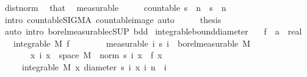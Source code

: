 \begin{isabellebody}
\ dist{\isacharunderscore}{\kern0pt}norm\ \isamarkupfalse%
\ that\ \isamarkupfalse%
\ measurable\isanewline
\ \ \isamarkupfalse%
\ \isamarkupfalse%
\ {\isachardoublequoteopen}countable\ {\isacharparenleft}{\kern0pt}s\ {\isacharbackquote}{\kern0pt}\ {\isacharbraceleft}{\kern0pt}n{\isachardot}{\kern0pt}{\isachardot}{\kern0pt}{\isacharbraceright}{\kern0pt}\ {\isasymtimes}\ s\ {\isacharbackquote}{\kern0pt}\ {\isacharbraceleft}{\kern0pt}n{\isachardot}{\kern0pt}{\isachardot}{\kern0pt}{\isacharbraceright}{\kern0pt}{\isacharparenright}{\kern0pt}{\isachardoublequoteclose}\ \isamarkupfalse%
\ {\isacharparenleft}{\kern0pt}intro\ countable{\isacharunderscore}{\kern0pt}SIGMA\ countable{\isacharunderscore}{\kern0pt}image{\isacharcomma}{\kern0pt}\ auto{\isacharparenright}{\kern0pt}\isanewline
\ \ \isamarkupfalse%
\ \isamarkupfalse%
\ {\isacharquery}{\kern0pt}thesis\ \isamarkupfalse%
\ {\isacharasterisk}{\kern0pt}\ \isamarkupfalse%
\ {\isacharparenleft}{\kern0pt}auto\ intro{\isacharbang}{\kern0pt}{\isacharcolon}{\kern0pt}\ borel{\isacharunderscore}{\kern0pt}measurable{\isacharunderscore}{\kern0pt}cSUP\ bdd{\isacharparenright}{\kern0pt}\isanewline
{}\isamarkupfalse%
%
\endisatagproof
{\isafoldproof}%
%
\isadelimproof
\isanewline
%
\endisadelimproof
\isanewline
{}\isamarkupfalse%
\ integrable{\isacharunderscore}{\kern0pt}bound{\isacharunderscore}{\kern0pt}diameter{\isacharcolon}{\kern0pt}\isanewline
\ \ \ f\ {\isacharcolon}{\kern0pt}{\isacharcolon}{\kern0pt}\ {\isachardoublequoteopen}{\isacharprime}{\kern0pt}a\ {\isasymRightarrow}\ real{\isachardoublequoteclose}\isanewline
\ \ \ {\isachardoublequoteopen}integrable\ M\ f{\isachardoublequoteclose}\ \isanewline
\ \ \ \ \ \ \ {\isacharbrackleft}{\kern0pt}measurable{\isacharbrackright}{\kern0pt}{\isacharcolon}{\kern0pt}\ {\isachardoublequoteopen}{\isasymAnd}i{\isachardot}{\kern0pt}\ {\isacharparenleft}{\kern0pt}s\ i{\isacharparenright}{\kern0pt}\ {\isasymin}\ borel{\isacharunderscore}{\kern0pt}measurable\ M{\isachardoublequoteclose}\isanewline
\ \ \ \ \ \ \ {\isachardoublequoteopen}{\isasymAnd}x\ i{\isachardot}{\kern0pt}\ x\ {\isasymin}\ space\ M\ {\isasymLongrightarrow}\ norm\ {\isacharparenleft}{\kern0pt}s\ i\ x{\isacharparenright}{\kern0pt}\ {\isasymle}\ f\ x{\isachardoublequoteclose}\isanewline
\ \ \ \ \ {\isachardoublequoteopen}integrable\ M\ {\isacharparenleft}{\kern0pt}{\isasymlambda}x{\isachardot}{\kern0pt}\ diameter\ {\isacharbraceleft}{\kern0pt}s\ i\ x\ {\isacharbar}{\kern0pt}i{\isachardot}{\kern0pt}\ n\ {\isasymle}\ i{\isacharbraceright}{\kern0pt}{\isacharparenright}{\kern0pt}{\isachardoublequoteclose}\isanewline

\end{isabellebody}
